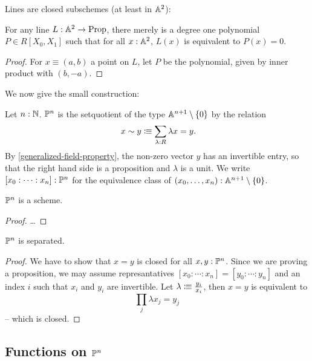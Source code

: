 Lines are closed subschemes (at least in $\mathbb{A}^2$):

\begin{proposition}%
  For any line $L : \mathbb{A}^{2}\to \mathrm{Prop}$, there merely is a degree one polynomial $P\in R[X_0,X_1]$ such that
  for all $x:\mathbb{A}^{2}$, $L(x)$ is equivalent to $P(x)=0$.
\end{proposition}

\begin{proof}
  For $x\equiv(a,b)$ a point on $L$,
  let $P$ be the polynomial, given by inner product with $(b,-a)$. 
\end{proof}

We now give the small construction:

\begin{definition}%
  \label{projective-space-hit}
  Let $n:\mathbb{N}$.
   $\mathbb{P}^n$ is the setquotient of the type $\mathbb{A}^{n+1}\setminus\{0\}$ by the relation
  \[
    x \sim y \colonequiv \sum_{\lambda : R} \lambda x=y\rlap{.}
  \]
  By \cref{generalized-field-property}, the non-zero vector $y$ has an invertible entry,
  so that the right hand side is a proposition and $\lambda$ is a unit.
  We write $[x_0:\dots:x_n]:\mathbb{P}^n$ for the equivalence class of $(x_0,\dots,x_n):\mathbb{A}^{n+1}\setminus\{0\}$.
\end{definition}

\begin{theorem}
  $\mathbb{P}^n$ is a scheme.
\end{theorem}

\begin{proof}
  \dots
\end{proof}

\begin{proposition}
  \label{projective-space-separated}
  $\mathbb{P}^n$ is separated.
\end{proposition}

\begin{proof}
  We have to show that $x=y$ is closed for all $x,y:\mathbb{P}^n$.
  Since we are proving a proposition, we may assume represantatives
  $[x_0:\cdots:x_n]=[y_0:\cdots:y_n]$ and an index $i$ such that $x_i$ and $y_i$ are invertible.
  Let $\lambda\vcentcolon\mspace{-1.2mu}\equiv \frac{y_i}{x_i}$, then $x=y$ is equivalent to
  \[
    \prod_j \lambda x_j=y_j
  \]
  -- which is closed.
\end{proof}
\subsection{Functions on $\mathbb{P}^n$}

